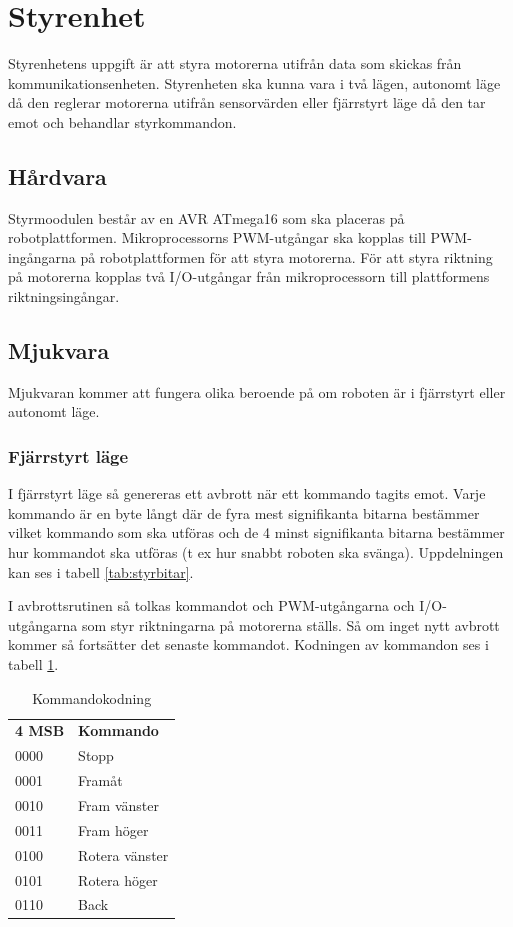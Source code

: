 \section{Styrenhet}
Styrenhetens uppgift är att styra motorerna utifrån data som skickas från kommunikationsenheten.
Styrenheten ska kunna vara i två lägen, autonomt läge då den reglerar motorerna utifrån sensorvärden eller 
fjärrstyrt läge då den tar emot och behandlar styrkommandon.
\subsection{Hårdvara}
Styrmoodulen består av en AVR ATmega16 som ska placeras på robotplattformen.
Mikroprocessorns PWM-utgångar ska kopplas till PWM-ingångarna på robotplattformen för att styra motorerna.
För att styra riktning på motorerna kopplas två I/O-utgångar från mikroprocessorn till plattformens riktningsingångar.
\subsection{Mjukvara}
Mjukvaran kommer att fungera olika beroende på om roboten är i fjärrstyrt eller autonomt läge.
\subsubsection{Fjärrstyrt läge}
I fjärrstyrt läge så genereras ett avbrott när ett kommando tagits emot.
Varje kommando är en byte långt där de fyra mest signifikanta bitarna bestämmer vilket kommando som ska utföras
och de 4 minst signifikanta bitarna bestämmer hur kommandot ska utföras (t ex hur snabbt roboten ska svänga).
Uppdelningen kan ses i tabell \ref{tab:styrbitar}.

I avbrottsrutinen så tolkas kommandot och PWM-utgångarna och I/O-utgångarna som styr riktningarna på motorerna ställs.
Så om inget nytt avbrott kommer så fortsätter det senaste kommandot.
Kodningen av kommandon ses i tabell \ref{tab:kodning}.

\begin{table}[h] 
  \begin{center}
        \begin{tabular}{l l}
                \textbf{4 MSB} & \textbf{Kommando} \\
                0000 & Stopp \\
                0001 & Framåt \\
                0010 & Fram vänster \\
                0011 & Fram höger \\
                0100 & Rotera vänster \\
                0101 & Rotera höger \\
                0110 & Back \\
        \end{tabular}
        \caption{Kommandokodning}
        \label{tab:kodning}
  \end{center}
\end{table}

